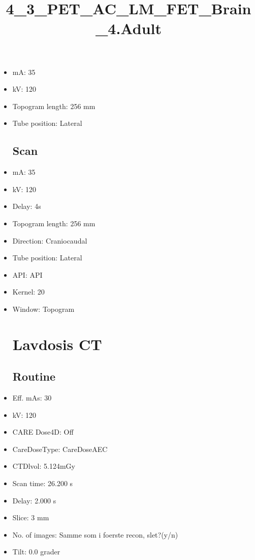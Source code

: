 \documentclass[12pt]{article}
\title{4\_3\_PET\_AC\_LM\_FET\_Brain\_4.Adult}
\begin{document}
\maketitle
\newpage
\tableofcontents
\newpage
{}


\begin{itemize}\section{Topogram}
\subsection{Routine}
\item mA: 35\item kV: 120\item Topogram length: 256 mm\item Tube position: Lateral
\subsection{Scan}\item mA: 35\item kV: 120\item Delay: 4s\item Topogram length: 256 mm\item Direction: Craniocaudal\item Tube position: Lateral\item API: API \item Kernel: 20\item Window: Topogram
\section{Lavdosis CT}
\subsection{Routine}
\item Eff. mAs: 30\item kV: 120\item CARE Dose4D: Off\item CareDoseType: CareDoseAEC\item CTDlvol: 5.124mGy\item Scan time: 26.200 s\item Delay: 2.000 s\item Slice: 3 mm\item No. of images: Samme som i foerste recon, slet?(y/n)\item Tilt: 0.0 grader

\end{itemize}
\end{document}

